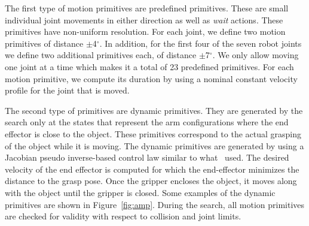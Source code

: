 \documentclass[a4paper]{report}
\begin{document}
The first type of motion primitives are predefined primitives. These are small individual joint movements in either direction as well as \emph{wait} actions.
These primitives have non-uniform resolution. For each joint, we define two motion primitives of distance $\pm$4$^{\circ}$. In addition, for the first four of the seven robot joints we define two additional primitives each, of distance $\pm$7$^{\circ}$. We only allow moving one joint at a time which makes it a total of 23 predefined primitives.
For each motion primitive, we compute its duration by using a nominal constant velocity profile for the joint that is moved.
%

The second type of primitives are dynamic primitives. They are generated by the search only at the states that represent the arm configurations where the end effector is close to the object. These primitives correspond to the actual grasping of the object while it is moving.
The dynamic primitives are generated by using a Jacobian pseudo inverse-based control law similar to what~\cite{menon2014motion} used. 
The desired velocity of the end effector is computed for which the end-effector minimizes the distance to the grasp pose. Once the gripper encloses the object, it moves along with the object until the gripper is closed. Some examples of the dynamic primitives are shown in Figure~\ref{fig:amp}. During the search, all motion primitives are checked for validity with respect to collision and joint limits.
\end{document}
